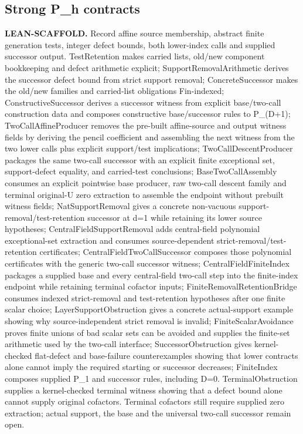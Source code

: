 \subsection{Strong P\_h contracts}\hypertarget{claim:ph-scaffold}{}\backmap
\textbf{LEAN-SCAFFOLD.} Record affine source membership, abstract finite generation tests, integer defect bounds, both lower-index calls and supplied successor output. TestRetention makes carried lists, old/new component bookkeeping and defect arithmetic explicit; SupportRemovalArithmetic derives the successor defect bound from strict support removal; ConcreteSuccessor makes the old/new families and carried-list obligations Fin-indexed; ConstructiveSuccessor derives a successor witness from explicit base/two-call construction data and composes constructive base/successor rules to P\_(D+1); TwoCallAffineProducer removes the pre-built affine-source and output witness fields by deriving the pencil coefficient and assembling the next witness from the two lower calls plus explicit support/test implications; TwoCallDescentProducer packages the same two-call successor with an explicit finite exceptional set, support-defect equality, and carried-test conclusions; BaseTwoCallAssembly consumes an explicit pointwise base producer, raw two-call descent family and terminal original-U zero extraction to assemble the endpoint without prebuilt witness fields; NatSupportRemoval gives a concrete non-vacuous support-removal/test-retention successor at d=1 while retaining its lower source hypotheses; CentralFieldSupportRemoval adds central-field polynomial exceptional-set extraction and consumes source-dependent strict-removal/test-retention certificates; CentralFieldTwoCallSuccessor composes those polynomial certificates with the generic two-call successor witness; CentralFieldFiniteIndex packages a supplied base and every central-field two-call step into the finite-index endpoint while retaining terminal cofactor inputs; FiniteRemovalRetentionBridge consumes indexed strict-removal and test-retention hypotheses after one finite scalar choice; LayerSupportObstruction gives a concrete actual-support example showing why source-independent strict removal is invalid; FiniteScalarAvoidance proves finite unions of bad scalar sets can be avoided and supplies the finite-set arithmetic used by the two-call interface; SuccessorObstruction gives kernel-checked flat-defect and base-failure counterexamples showing that lower contracts alone cannot imply the required starting or successor decreases; FiniteIndex composes supplied P\_1 and successor rules, including D=0. TerminalObstruction supplies a kernel-checked terminal witness showing that a defect bound alone cannot supply original cofactors. Terminal cofactors still require supplied zero extraction; actual support, the base and the universal two-call successor remain open.

